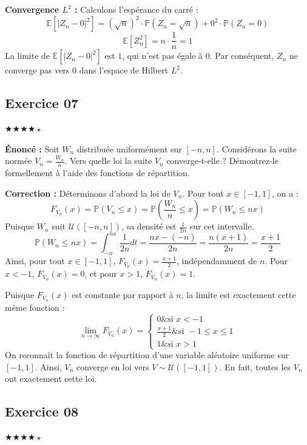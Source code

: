\documentclass[11pt,a4paper]{article}
\begin{document}
\textbf{Convergence $L^2$ :}
Calculons l'espérance du carré :
$$ \mathbb{E}[|Z_n - 0|^2] = (\sqrt{n})^2 \cdot \mathbb{P}(Z_n = \sqrt{n}) + 0^2 \cdot \mathbb{P}(Z_n = 0) $$
$$ \mathbb{E}[Z_n^2] = n \cdot \frac{1}{n} = 1 $$
La limite de $\mathbb{E}[|Z_n - 0|^2]$ est $1$, qui n'est pas égale à $0$. Par conséquent, $Z_n$ ne converge pas vers $0$ dans l'espace de Hilbert $L^2$.


\subsection*{Exercice 07}

\quad $\bigstar\bigstar\bigstar\bigstar\star$

\textbf{Énoncé :}
Soit $W_n$ distribuée uniformément sur $[-n, n]$. Considérons la suite normée $V_n = \frac{W_n}{n}$.
Vers quelle loi la suite $V_n$ converge-t-elle ? Démontrez-le formellement à l'aide des fonctions de répartition.

\textbf{Correction :}
Déterminons d'abord la loi de $V_n$. Pour tout $x \in [-1, 1]$, on a :
$$ F_{V_n}(x) = \mathbb{P}(V_n \le x) = \mathbb{P}\left(\frac{W_n}{n} \le x\right) = \mathbb{P}(W_n \le nx) $$
Puisque $W_n$ suit $\mathcal{U}([-n, n])$, sa densité est $\frac{1}{2n}$ sur cet intervalle.
$$ \mathbb{P}(W_n \le nx) = \int_{-n}^{nx} \frac{1}{2n} dt = \frac{nx - (-n)}{2n} = \frac{n(x+1)}{2n} = \frac{x+1}{2} $$
Ainsi, pour tout $x \in [-1, 1]$, $F_{V_n}(x) = \frac{x+1}{2}$, indépendamment de $n$.
Pour $x < -1$, $F_{V_n}(x) = 0$, et pour $x > 1$, $F_{V_n}(x) = 1$.

Puisque $F_{V_n}(x)$ est constante par rapport à $n$, la limite est exactement cette même fonction :
$$ \lim_{n \to \infty} F_{V_n}(x) = \begin{cases} 0 \& \text{si } x < -1 \\ \frac{x+1}{2} \& \text{si } -1 \le x \le 1 \\ 1 \& \text{si } x > 1 \end{cases} $$
On reconnaît la fonction de répartition d'une variable aléatoire uniforme sur $[-1, 1]$.
Ainsi, $V_n$ converge en loi vers $V \sim \mathcal{U}([-1, 1])$. En fait, toutes les $V_n$ ont exactement cette loi.


\subsection*{Exercice 08}

\quad $\bigstar\bigstar\bigstar\bigstar\star$
\end{document}
